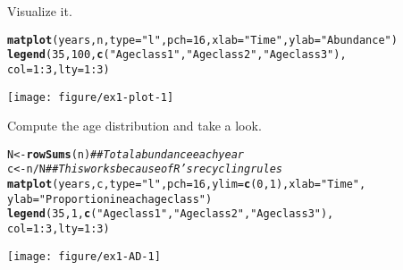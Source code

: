 \documentclass[12pt]{article}\usepackage[]{graphicx}\usepackage[]{xcolor}
\makeatletter
\newcommand{\hlnum}[1]{\textcolor[rgb]{0.686,0.059,0.569}{#1}}%
\newcommand{\hlsng}[1]{\textcolor[rgb]{0.192,0.494,0.8}{#1}}%
\newcommand{\hlcom}[1]{\textcolor[rgb]{0.678,0.584,0.686}{\textit{#1}}}%
\newcommand{\hlopt}[1]{\textcolor[rgb]{0,0,0}{#1}}%
\newcommand{\hldef}[1]{\textcolor[rgb]{0.345,0.345,0.345}{#1}}%
\newcommand{\hlkwb}[1]{\textcolor[rgb]{0.69,0.353,0.396}{#1}}%
\newcommand{\hlkwc}[1]{\textcolor[rgb]{0.333,0.667,0.333}{#1}}%
\newcommand{\hlkwd}[1]{\textcolor[rgb]{0.737,0.353,0.396}{\textbf{#1}}}%
\newenvironment{kframe}{%
 \def\at@end@of@kframe{}%
 \ifinner\ifhmode%
  \def\at@end@of@kframe{\end{minipage}}%
  \begin{minipage}{\columnwidth}%
 \fi\fi%
 \def\FrameCommand##1{\hskip\@totalleftmargin \hskip-\fboxsep
 \colorbox{shadecolor}{##1}\hskip-\fboxsep
     \hskip-\linewidth \hskip-\@totalleftmargin \hskip\columnwidth}%
 \MakeFramed {\advance\hsize-\width
   \@totalleftmargin\z@ \linewidth\hsize
   \@setminipage}}%
 {\par\unskip\endMakeFramed%
 \at@end@of@kframe}
\newenvironment{knitrout}{}{} %
\makeatother
\begin{document}
\clearpage


Visualize it.
\begin{knitrout}
\color{fgcolor}\begin{kframe}
\begin{alltt}
\hlkwd{matplot}\hldef{(years, n,} \hlkwc{type}\hldef{=}\hlsng{"l"}\hldef{,} \hlkwc{pch}\hldef{=}\hlnum{16}\hldef{,} \hlkwc{xlab}\hldef{=}\hlsng{"Time"}\hldef{,} \hlkwc{ylab}\hldef{=}\hlsng{"Abundance"}\hldef{)}
\hlkwd{legend}\hldef{(}\hlnum{35}\hldef{,} \hlnum{100}\hldef{,} \hlkwd{c}\hldef{(}\hlsng{"Age class 1"}\hldef{,} \hlsng{"Age class 2"}\hldef{,} \hlsng{"Age class 3"}\hldef{),}
       \hlkwc{col}\hldef{=}\hlnum{1}\hlopt{:}\hlnum{3}\hldef{,} \hlkwc{lty}\hldef{=}\hlnum{1}\hlopt{:}\hlnum{3}\hldef{)}
\end{alltt}
\end{kframe}

{\centering \texttt{[image: figure/ex1-plot-1]} 

}


\end{knitrout}

\clearpage

Compute the age distribution and take a look.
\begin{knitrout}
\color{fgcolor}\begin{kframe}
\begin{alltt}
\hldef{N} \hlkwb{<-} \hlkwd{rowSums}\hldef{(n)} \hlcom{## Total abundance each year}
\hldef{c} \hlkwb{<-} \hldef{n}\hlopt{/}\hldef{N}        \hlcom{## This works because of R's recycling rules}
\hlkwd{matplot}\hldef{(years, c,} \hlkwc{type}\hldef{=}\hlsng{"l"}\hldef{,} \hlkwc{pch}\hldef{=}\hlnum{16}\hldef{,} \hlkwc{ylim}\hldef{=}\hlkwd{c}\hldef{(}\hlnum{0}\hldef{,} \hlnum{1}\hldef{),} \hlkwc{xlab}\hldef{=}\hlsng{"Time"}\hldef{,}
        \hlkwc{ylab}\hldef{=}\hlsng{"Proportion in each age class"}\hldef{)}
\hlkwd{legend}\hldef{(}\hlnum{35}\hldef{,} \hlnum{1}\hldef{,} \hlkwd{c}\hldef{(}\hlsng{"Age class 1"}\hldef{,} \hlsng{"Age class 2"}\hldef{,} \hlsng{"Age class 3"}\hldef{),}
       \hlkwc{col}\hldef{=}\hlnum{1}\hlopt{:}\hlnum{3}\hldef{,} \hlkwc{lty}\hldef{=}\hlnum{1}\hlopt{:}\hlnum{3}\hldef{)}
\end{alltt}
\end{kframe}

{\centering \texttt{[image: figure/ex1-AD-1]} 

}


\end{knitrout}
\end{document}
